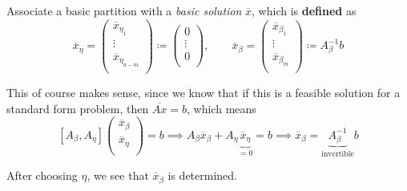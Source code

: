 Associate a basic partition with a \emph{basic solution} \(\overline{x}\), which is \textbf{defined} as
\[
	\overline{x}_{\eta} = \begin{pmatrix}
		\overline{x}_{\eta_1}     \\
		\vdots                    \\
		\overline{x}_{\eta_{n-m}} \\
	\end{pmatrix}\coloneqq \begin{pmatrix}
		0      \\
		\vdots \\
		0      \\
	\end{pmatrix},\qquad \overline{x}_{\beta} = \begin{pmatrix}
		\overline{x}_{\beta_1} \\
		\vdots                 \\
		\overline{x}_{\beta_m} \\
	\end{pmatrix}\coloneqq A^{-1}_{\beta}b
\]

\begin{intuition}
	This of course makes sense, since we know that if this is a feasible solution for a standard form problem, then \(\overline{Ax} = b\), which means
	\[
		\left[ A_{\beta}, A_{\eta} \right] \begin{pmatrix}
			\overline{x}_{\beta} \\
			\overline{x}_{\eta}  \\
		\end{pmatrix} = b \implies A_{\beta}\overline{x}_{\beta} + A_{\eta}\underbrace{\overline{x}_{\eta}}_{=0} = b\implies \overline{x}_{\beta} = \underbrace{A^{-1}_{\beta}}_{\text{invertible}}b
	\]
\end{intuition}

\begin{remark}
	After choosing \(\eta\), we see that \(\overline{x}_{\beta}\) is determined.
\end{remark}

